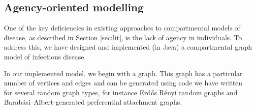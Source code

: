 \documentclass[../report.tex]{subfiles}
\begin{document}
\subsection{Agency-oriented modelling}

One of the key deficiencies in existing approaches to compartmental models of disease, as described in Section \ref{sec:lit}, is the lack of agency in individuals. To address this, we have designed and implemented (in Java) a compartmental graph model of infectious disease.

In our implemented model, we begin with a graph. This graph has a particular number of vertices and edges and can be generated using code we have written for several random graph types, for instance Erd\H{o}s R\'{e}nyi random graphs and Barab\'{a}si–Albert-generated preferential attachment graphs.
\end{document}
